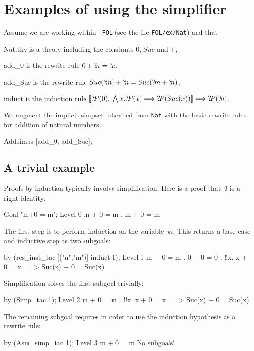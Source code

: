 \section{Examples of using the simplifier}
 Assume we are working within {\tt
  FOL} (see the file \texttt{FOL/ex/Nat}) and that
\begin{ttdescription}
\item[Nat.thy] 
  is a theory including the constants $0$, $Suc$ and $+$,
\item[add_0]
  is the rewrite rule $0+{?\!n} = {?\!n}$,
\item[add_Suc]
  is the rewrite rule $Suc({?\!m})+{?\!n} = Suc({?\!m}+{?\!n})$,
\item[induct]
  is the induction rule $\mathopen{[\![}{?\!P}(0);\; \bigwedge x. {?\!P}(x)\Longrightarrow
    {?\!P}(Suc(x))\mathclose{]\!]} \Longrightarrow {?\!P}({?\!n})$.
\end{ttdescription}
We augment the implicit simpset inherited from \texttt{Nat} with the
basic rewrite rules for addition of natural numbers:
\begin{ttbox}
Addsimps [add_0, add_Suc];
\end{ttbox}

\subsection{A trivial example}
Proofs by induction typically involve simplification.  Here is a proof
that~0 is a right identity:
\begin{ttbox}
Goal "m+0 = m";
{\out Level 0}
{\out m + 0 = m}
{. m + 0 = m}
\end{ttbox}
The first step is to perform induction on the variable~$m$.  This returns a
base case and inductive step as two subgoals:
\begin{ttbox}
by (res_inst_tac [("n","m")] induct 1);
{\out Level 1}
{\out m + 0 = m}
{. 0 + 0 = 0}
{. !!x. x + 0 = x ==> Suc(x) + 0 = Suc(x)}
\end{ttbox}
Simplification solves the first subgoal trivially:
\begin{ttbox}
by (Simp_tac 1);
{\out Level 2}
{\out m + 0 = m}
{. !!x. x + 0 = x ==> Suc(x) + 0 = Suc(x)}
\end{ttbox}
The remaining subgoal requires  in order to use the
induction hypothesis as a rewrite rule:
\begin{ttbox}
by (Asm_simp_tac 1);
{\out Level 3}
{\out m + 0 = m}
{\out No subgoals!}
\end{ttbox}

